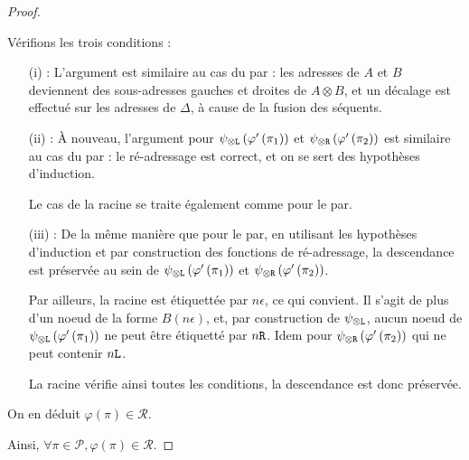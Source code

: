 \documentclass[11pt,a4paper]{article}
\theoremstyle{plain}
\theoremstyle{definition}
\theoremstyle{remark}
\newcommand*{\tensor}{\otimes}
\newcommand*{\someproof}{\pi}
\newcommand*{\Left}{\textnormal{\texttt{L}}}
\newcommand*{\Right}{\textnormal{\texttt{R}}}
\newcommand*{\proofs}{\ensuremath{\mathcal{P}}}
\newcommand*{\representations}{\ensuremath{\mathcal{R}}}
\newcommand*{\encode}{\ensuremath{\varphi}}
\begin{document}
\begin{proof}
\begin{itemize}
    Vérifions les trois conditions :
    \begin{itemize}
        \item[(i) :] L'argument est similaire au cas du par : les adresses de $A$ et $B$ deviennent des sous-adresses gauches et droites de $A \tensor B$, et un décalage est effectué sur les adresses de $\Delta$, à cause de la fusion des séquents.

        \item[(ii) :] À nouveau, l'argument pour $\psi_{\tensor\Left} \left( \encode' \left( \pi_1 \right) \right)$ et $\psi_{\tensor\Right} \left( \encode' \left( \pi_2 \right) \right)$ est similaire au cas du par : le ré-adressage est correct, et on se sert des hypothèses d'induction. 
        
        Le cas de la racine se traite également comme pour le par.

        \item[(iii) :] De la même manière que pour le par, en utilisant les hypothèses d'induction et par construction des fonctions de ré-adressage, la descendance est préservée au sein de $\psi_{\tensor\Left} \left( \encode' \left( \pi_1 \right) \right)$ et $\psi_{\tensor\Right} \left( \encode' \left( \pi_2 \right) \right)$.

        Par ailleurs, la racine est étiquettée par $n \epsilon$, ce qui convient. Il s'agit de plus d'un noeud de la forme $B(n \epsilon)$, et, par construction de $\psi_{\tensor\Left}$, aucun noeud de $\psi_{\tensor\Left} \left( \encode' \left( \pi_1 \right) \right)$ ne peut être étiquetté par $n \Right$. Idem pour $\psi_{\tensor\Right} \left( \encode' \left( \pi_2 \right) \right)$ qui ne peut contenir $n \Left$.

        La racine vérifie ainsi toutes les conditions, la descendance est donc préservée.
    \end{itemize}

    On en déduit $\encode \left( \someproof \right) \in \representations$.

    \end{itemize}

    Ainsi, $\forall \someproof \in \proofs, \encode \left( \someproof \right) \in \representations$.
    
\end{proof}
\end{document}
